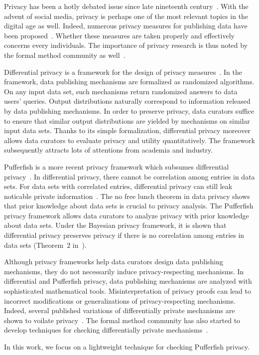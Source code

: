 

Privacy has been a hotly debated issue since late nineteenth
century~\cite{WB:90:RP}. With the advent of social media, privacy is
perhaps one of the most relevant topics in the digital age as
well. Indeed, numerous privacy measures for publishing data 
have been proposed~\cite{S:2002:KAMPP,FWC:10:PPDP}. Whether these
measures are taken properly and effectively concerns every
individuals. The importance of privacy research is thus noted by the
formal method community as well~\cite{TW:09:FMP}.


Differential privacy is a framework for the design of privacy
measures~\cite{D:06:DP,DR:14:AFDP}. In the framework, data publishing
mechanisms are formalized as randomized algorithms. On any input data
set, such mechanisms return randomized answers to data users' queries. 
Output distributions naturally correspond to information released by
data publishing mechanisms. In order to preserve privacy, data
curators suffice to ensure that similar output distributions are
yielded by mechanisms on similar input data sets. Thanks to its simple
formalization, differential privacy moreover allows data curators 
to evaluate privacy and utility quantitatively. The framework
subsequently attracts lots of attentions from academia and industry.


Pufferfish is a more recent privacy framework which subsumes
differential privacy~\cite{KM:14:PFMPD}. In differential privacy,
there cannot be correlation among entries in data sets. For data sets
with correlated entries, differential privacy can still leak
noticable private information~\cite{KM:11:NFLDP}. The no free lunch
theorem in data privacy shows that prior knowledge about data sets is
crucial to privacy analysis. The Pufferfish privacy framework allows
data curators to analyze privacy with prior knowledge about data
sets. Under the Bayesian privacy framework, it is shown that
differential privacy preserves privacy if there is no correlation
among entries in data sets (Theorem~2 in~\cite{KM:14:PFMPD}).


Although privacy frameworks help data curators design data publishing
mechanisms, they do not necessarily induce privacy-respecting
mechanisms. In differential and Pufferfish privacy, data publishing
mechanisms are analyzed with sophisticated mathematical tools. 
Misinterpretation of privacy proofs can lead to incorrect
modifications or generalizations of privacy-respecting mechanisms. 
Indeed, several published variations of differentially private
mechanisms are shown to voilate privacy~\cite{DWWZK:18:DVDP}. The
formal method community has also started to develop techniques for
checking differentially private
mechanisms~\cite{TKD:11:FVDPIS,GHHNP:13:LDTDP,BDGKZ:13:VCDP}. 


In this work, we focus on a lightweight technique for checking
Pufferfish privacy. 



